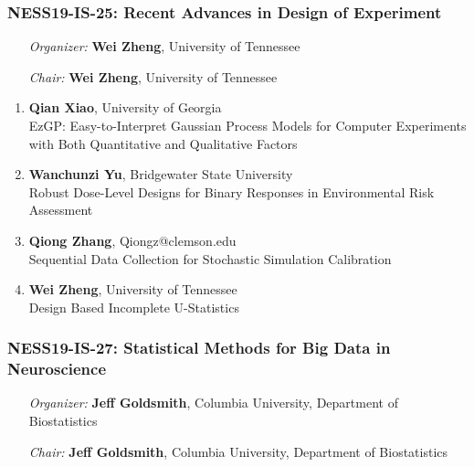 \subsubsection*{NESS19-IS-25: Recent Advances in Design of Experiment}

\begin{enumerate}[align=left]
\item [\emph{Organizer:}] \textbf{Wei Zheng}, University of Tennessee
\item [\emph{Chair:}] \textbf{Wei Zheng}, University of Tennessee
\end{enumerate}

\begin{enumerate}
\item \textbf{Qian Xiao}, University of Georgia \\
EzGP: Easy-to-Interpret Gaussian Process Models for Computer Experiments with Both Quantitative and Qualitative Factors
\item \textbf{Wanchunzi Yu}, Bridgewater State University \\
Robust Dose-Level Designs for Binary Responses in Environmental Risk Assessment
\item \textbf{Qiong Zhang}, Qiongz@clemson.edu \\
Sequential Data Collection for Stochastic Simulation Calibration
\item \textbf{Wei Zheng}, University of Tennessee \\
Design Based Incomplete U-Statistics
\end{enumerate}

\subsubsection*{NESS19-IS-27: Statistical Methods for Big Data in Neuroscience}

\begin{enumerate}[align=left]
\item [\emph{Organizer:}] \textbf{Jeff Goldsmith}, Columbia University, Department of Biostatistics
\item [\emph{Chair:}] \textbf{Jeff Goldsmith}, Columbia University, Department of Biostatistics
\end{enumerate}

